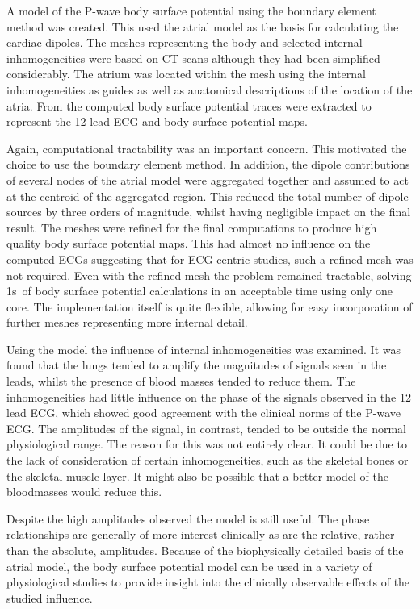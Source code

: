 A model of the P-wave body surface potential using the boundary element method
was created.
This used the atrial model as the basis for calculating the cardiac dipoles.
The meshes representing the body and selected internal inhomogeneities were
based on CT scans although they had been simplified considerably.
The atrium was located within the mesh using the internal inhomogeneities as
guides as well as anatomical descriptions of the location of the atria.
From the computed body surface potential traces were extracted to represent the
12 lead ECG and body surface potential maps.


Again, computational tractability was an important concern.
This motivated the choice to use the boundary element method.
In addition, the dipole contributions of several nodes of the atrial model were
aggregated together and assumed to act at the centroid of the aggregated region.
This reduced the total number of dipole sources by three orders of magnitude,
whilst having negligible impact on the final result.
The meshes were refined for the final computations to produce high quality body
surface potential maps.
This had almost no influence on the computed ECGs suggesting that for ECG
centric studies, such a refined mesh was not required.
Even with the refined mesh the problem remained tractable, solving \unit{1}{s}\
of body surface potential calculations in an acceptable time using only one
core.
The implementation itself is quite flexible, allowing for easy incorporation of
further meshes representing more internal detail.

Using the model the influence of internal inhomogeneities was examined.
It was found that the lungs tended to amplify the magnitudes of signals seen in
the leads, whilst the presence of blood masses tended to reduce them.
The inhomogeneities had little influence on the phase of the signals observed in
the 12 lead ECG, which showed good agreement with the clinical norms of the
P-wave ECG.
The amplitudes of the signal, in contrast, tended to be outside the normal
physiological range.
The reason for this was not entirely clear.
It could be due to the lack of consideration of certain inhomogeneities, such as
the skeletal bones or the skeletal muscle layer.
It might also be possible that a better model of the bloodmasses would reduce
this.

Despite the high amplitudes observed the model is still useful.
The phase relationships are generally of more interest clinically as are the
relative, rather than the absolute, amplitudes.
Because of the biophysically detailed basis of the atrial model, the body
surface potential model can be used in a variety of physiological studies to
provide insight into the clinically observable effects of the studied influence.

